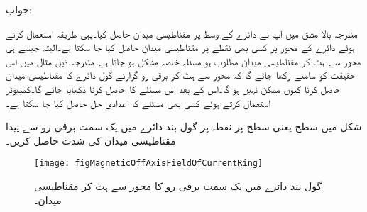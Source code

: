 جواب: 

مندرجہ بالا مشق میں آپ نے دائرے کے وسط پر مقناطیسی میدان حاصل کیا۔یہی طریقہ استعمال کرتے ہوئے دائرے کے محور پر کسی بھی نقطے پر مقناطیسی میدان حاصل کیا جا سکتا ہے۔البتہ جیسے ہی محور سے ہٹ کر مقناطیسی میدان مطلوب ہو مسئلہ خاصہ مشکل ہو جاتا ہے۔مندرجہ ذیل مثال میں اس حقیقت کو سامنے رکھا جائے گا کہ محور سے ہٹ کر برقی رو گزارتے گول دائرے کا مقناطیسی میدان حاصل کرنا کیوں ممکن نہیں ہو گا۔اس کے بعد  اس مسئلے کا  حاصل کرنا دکھایا جائے گا۔کمپیوٹر استعمال کرتے ہوئے کسی بھی مسئلے کا اعدادی حل حاصل کیا جا سکتا ہے۔

شکل  میں  سطح یعنی  سطح پر نقطہ  پر گول بند دائرے میں یک سمت برقی رو سے پیدا مقناطیسی میدان کی شدت حاصل کریں۔ 
\begin{figure}
\centering
\texttt{[image: figMagneticOffAxisFieldOfCurrentRing]}
\caption{گول بند دائرے میں یک سمت برقی رو کا محور سے ہٹ کر مقناطیسی میدان۔}
\label{شکل_مقناطیسی_دائرہ_محور_سے_ہٹ_کر}
\end{figure}

